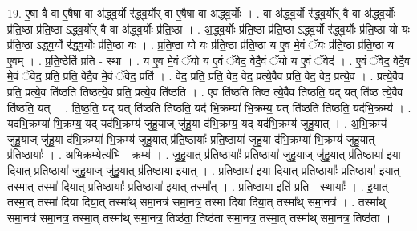 \documentclass[17pt]{extarticle}
\begin{document}
19. ए॒षा वै वा ए॒षैषा वा अ॑द्ध्व॒र्यो र॑द्ध्व॒र्योर् वा ए॒षैषा वा अ॑द्ध्व॒र्योः । . वा अ॑द्ध्व॒र्यो र॑द्ध्व॒र्योर् वै वा अ॑द्ध्व॒र्योः प्र॑ति॒ष्ठा प्र॑ति॒ष्ठा ऽद्ध्व॒र्योर् वै वा अ॑द्ध्व॒र्योः प्र॑ति॒ष्ठा । . अ॒द्ध्व॒र्योः प्र॑ति॒ष्ठा प्र॑ति॒ष्ठा ऽद्ध्व॒र्यो र॑द्ध्व॒र्योः प्र॑ति॒ष्ठा यो यः प्र॑ति॒ष्ठा ऽद्ध्व॒र्यो र॑द्ध्व॒र्योः प्र॑ति॒ष्ठा यः । . प्र॒ति॒ष्ठा यो यः प्र॑ति॒ष्ठा प्र॑ति॒ष्ठा य ए॒व मे॒वं ॅयः प्र॑ति॒ष्ठा प्र॑ति॒ष्ठा य ए॒वम् । . प्र॒ति॒ष्ठेति॑ प्रति - स्था । . य ए॒व मे॒वं ॅयो य ए॒वं ॅवेद॒ वेदै॒वं ॅयो य ए॒वं ॅवेद॑ । . ए॒वं ॅवेद॒ वेदै॒व मे॒वं ॅवेद॒ प्रति॒ प्रति॒ वेदै॒व मे॒वं ॅवेद॒ प्रति॑ । . वेद॒ प्रति॒ प्रति॒ वेद॒ वेद॒ प्रत्ये॒वैव प्रति॒ वेद॒ वेद॒ प्रत्ये॒व । . प्रत्ये॒वैव प्रति॒ प्रत्ये॒व ति॑ष्ठति तिष्ठत्ये॒व प्रति॒ प्रत्ये॒व ति॑ष्ठति । . ए॒व ति॑ष्ठति तिष्ठ त्ये॒वैव ति॑ष्ठति॒ यद् यत् ति॑ष्ठ त्ये॒वैव ति॑ष्ठति॒ यत् । . ति॒ष्ठ॒ति॒ यद् यत् ति॑ष्ठति तिष्ठति॒ यद॑ भि॒क्रम्या॑ भि॒क्रम्य॒ यत् ति॑ष्ठति तिष्ठति॒ यद॑भि॒क्रम्य॑ । . यद॑भि॒क्रम्या॑ भि॒क्रम्य॒ यद् यद॑भि॒क्रम्य॑ जुहु॒याज् जु॑हु॒या द॑भि॒क्रम्य॒ यद् यद॑भि॒क्रम्य॑ जुहु॒यात् । . अ॒भि॒क्रम्य॑ जुहु॒याज् जु॑हु॒या द॑भि॒क्रम्या॑ भि॒क्रम्य॑ जुहु॒यात् प्र॑ति॒ष्ठायाः᳚ प्रति॒ष्ठाया॑ जुहु॒या द॑भि॒क्रम्या॑ भि॒क्रम्य॑ जुहु॒यात् प्र॑ति॒ष्ठायाः᳚ । . अ॒भि॒क्रम्येत्य॑भि - क्रम्य॑ । . जु॒हु॒यात् प्र॑ति॒ष्ठायाः᳚ प्रति॒ष्ठाया॑ जुहु॒याज् जु॑हु॒यात् प्र॑ति॒ष्ठाया॑ इया दियात् प्रति॒ष्ठाया॑ जुहु॒याज् जु॑हु॒यात् प्र॑ति॒ष्ठाया॑ इयात् । . प्र॒ति॒ष्ठाया॑ इया दियात् प्रति॒ष्ठायाः᳚ प्रति॒ष्ठाया॑ इया॒त् तस्मा॒त् तस्मा॑ दियात् प्रति॒ष्ठायाः᳚ प्रति॒ष्ठाया॑ इया॒त् तस्मा᳚त् । . प्र॒ति॒ष्ठाया॒ इति॑ प्रति - स्थायाः᳚ । . इ॒या॒त् तस्मा॒त् तस्मा॑ दिया दिया॒त् तस्मा᳚थ् समा॒नत्र॑ समा॒नत्र॒ तस्मा॑ दिया दिया॒त् तस्मा᳚थ् समा॒नत्र॑ । . तस्मा᳚थ् समा॒नत्र॑ समा॒नत्र॒ तस्मा॒त् तस्मा᳚थ् समा॒नत्र॒ तिष्ठ॑ता॒ तिष्ठ॑ता समा॒नत्र॒ तस्मा॒त् तस्मा᳚थ् समा॒नत्र॒ तिष्ठ॑ता । \newline
\end{document}
